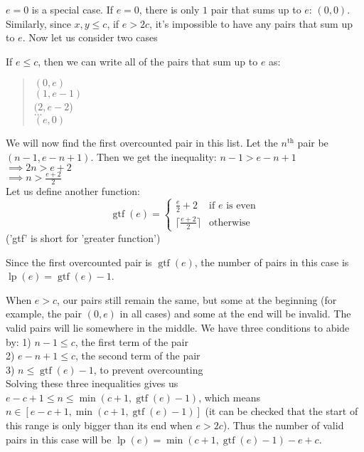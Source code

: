 \documentclass{article}
\begin{document}
$e=0$ is a special case. If $e=0$, there is only $1$ pair that sums up to $e$: $(0,0)$. Similarly, since $x,y \le c$, if $e > 2c$, it's impossible to have any pairs that sum up to $e$. Now let us consider two cases

If $e \le c$, then we can write all of the pairs that sum up to $e$ as:\\
\begin{quote}
$  (0,e)$\\
$  (1,e-1)$\\
$  (2,e-2$)\\
$  ...$\\
$  (e,0)$\\
\end{quote}

We will now find the first overcounted pair in this list. Let the $n^{\text{th}}$ pair be $(n-1,e-n+1)$. Then we get the inequality:
$\displaystyle n-1 > e-n+1$\\
$\displaystyle \implies 2n > e+2$\\
$\displaystyle \implies n > \frac{e+2}{2}$\\

Let us define another function:
$$\operatorname{gtf}(e) =
\begin{cases}
\displaystyle \frac{e}{2}+2 & \text{if } e \text{ is even} \\
\displaystyle \lceil\frac{e+2}{2}\rceil & \text{otherwise}
\end{cases}$$
('gtf' is short for 'greater function')

Since the first overcounted pair is $\operatorname{gtf}(e)$, the number of pairs in this case is $\operatorname{lp}(e)=\operatorname{gtf}(e)-1$.

When $e>c$, our pairs still remain the same, but some at the beginning (for example, the pair $(0,e)$ in all cases) and some at the end will be invalid. The valid pairs will lie somewhere in the middle. We have three conditions to abide by:
1) $n-1\le c$, the first term of the pair\\
2) $e-n+1 \le c$, the second term of the pair\\
3) $n \le \operatorname{gtf}(e)-1$, to prevent overcounting\\

Solving these three inequalities gives us $\displaystyle e-c+1 \le n \le \min(c+1, \operatorname{gtf}(e)-1)$, which means $n \in [e-c+1, \min(c+1, \operatorname{gtf}(e)-1)]$ (it can be checked that the start of this range is only bigger than its end when $e>2c$). Thus the number of valid pairs in this case will be $\operatorname{lp}(e)=\min(c+1, \operatorname{gtf}(e)-1)-e+c$.
\end{document}

